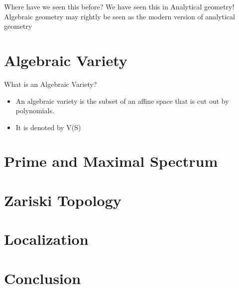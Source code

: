 \documentclass[pdf]{beamer}
\begin{document}
\begin{frame}
    Where have we seen this before?
    \pause
     We have seen this in Analytical geometry!
    \pause
    Algebraic geometry may rightly be seen as the modern version of analytical geometry
\end{frame}

\section{Algebraic Variety}

\begin{frame}
    What is an Algebraic Variety?
    \begin{itemize}
        \item<2-> An algebraic variety is the subset of an affine space that is cut out by polynomials.
        \item<3-> It is denoted by V(S)
    \end{itemize}
\end{frame}

\section{Prime and Maximal Spectrum}


\section{Zariski Topology}
\section{Localization}
\section{Conclusion}
\end{document}
